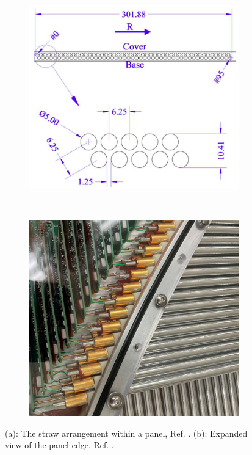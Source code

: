 \begin{figure}[!h]
\begin{subfigure}[t]{0.5\textwidth}
    \centering
    \includegraphics[width =\textwidth]{figures/png/Screenshot_20240326_234405.png}
    \caption{}
    \label{fig:trktubes}
    \end{subfigure}
    ~
    \begin{subfigure}[t]{0.5\textwidth}
        \centering
        \includegraphics[width =\textwidth]{figures/png/Screenshot_20240327_000131.png}
        \caption{}
        \label{fig:strawtubes}
        \end{subfigure}
        \caption[The straw arrangement within a panel.]{(a): The straw arrangement within a panel, Ref. \cite{trk}. (b): Expanded view of the panel edge, Ref. \cite{trk}.}
    \end{figure}

